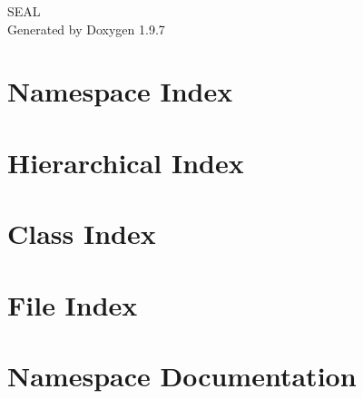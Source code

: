 \documentclass[twoside]{book}
\newcommand{\+}{\discretionary{\mbox{\scriptsize$\hookleftarrow$}}{}{}}
\newcommand{\clearemptydoublepage}{%
    \newpage{\pagestyle{empty}\cleardoublepage}%
  }
\begin{document}
  \raggedbottom
    \hypersetup{pageanchor=false,
                bookmarksnumbered=true,
                pdfencoding=unicode
               }
  \begin{titlepage}
  \vspace*{7cm}
  \begin{center}%
  {\Large SEAL}\\
  \vspace*{1cm}
  {\large Generated by Doxygen 1.9.7}\\
  \end{center}
  \end{titlepage}
  \clearemptydoublepage
  \tableofcontents
  \clearemptydoublepage
  \hypersetup{pageanchor=true}
\chapter{Namespace Index}

\chapter{Hierarchical Index}

\chapter{Class Index}

\chapter{File Index}

\chapter{Namespace Documentation}

\end{document}
